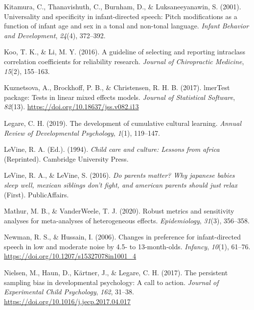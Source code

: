 \documentclass[
  ,man,floatsintext]{apa6}
\newlength{\cslhangindent}
\newlength{\cslentryspacingunit} %
\newenvironment{CSLReferences}[2] %
 {%
  \setlength{\parindent}{0pt}
  \ifodd #1
  \let\oldpar\par
  \def\par{\hangindent=\cslhangindent\oldpar}
  \fi
  \setlength{\parskip}{#2\cslentryspacingunit}
 }%
 {}
\begin{document}
\begin{CSLReferences}{1}{0}
\leavevmode{}%
Kitamura, C., Thanavishuth, C., Burnham, D., \& Luksaneeyanawin, S. (2001). Universality and specificity in infant-directed speech: Pitch modifications as a function of infant age and sex in a tonal and non-tonal language. \emph{Infant Behavior and Development}, \emph{24}(4), 372--392.

\leavevmode{}%
Koo, T. K., \& Li, M. Y. (2016). A guideline of selecting and reporting intraclass correlation coefficients for reliability research. \emph{Journal of Chiropractic Medicine}, \emph{15}(2), 155--163.

\leavevmode{}%
Kuznetsova, A., Brockhoff, P. B., \& Christensen, R. H. B. (2017). lmerTest package: Tests in linear mixed effects models. \emph{Journal of Statistical Software}, \emph{82}(13). \url{https://doi.org/10.18637/jss.v082.i13}

\leavevmode{}%
Legare, C. H. (2019). The development of cumulative cultural learning. \emph{Annual Review of Developmental Psychology}, \emph{1}(1), 119--147.

\leavevmode{}%
LeVine, R. A. (Ed.). (1994). \emph{Child care and culture: Lessons from africa} (Reprinted). Cambridge University Press.

\leavevmode{}%
LeVine, R. A., \& LeVine, S. (2016). \emph{Do parents matter? Why japanese babies sleep well, mexican siblings don't fight, and american parents should just relax} (First). PublicAffairs.

\leavevmode{}%
Mathur, M. B., \& VanderWeele, T. J. (2020). Robust metrics and sensitivity analyses for meta-analyses of heterogeneous effects. \emph{Epidemiology}, \emph{31}(3), 356--358.

\leavevmode{}%
Newman, R. S., \& Hussain, I. (2006). Changes in preference for infant-directed speech in low and moderate noise by 4.5- to 13-month-olds. \emph{Infancy}, \emph{10}(1), 61--76. \url{https://doi.org/10.1207/s15327078in1001_4}

\leavevmode{}%
Nielsen, M., Haun, D., Kärtner, J., \& Legare, C. H. (2017). The persistent sampling bias in developmental psychology: A call to action. \emph{Journal of Experimental Child Psychology}, \emph{162}, 31--38. \url{https://doi.org/10.1016/j.jecp.2017.04.017}


\end{CSLReferences}
\end{document}
